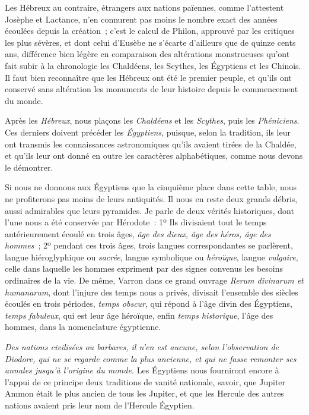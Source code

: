 \documentclass[french,twoside]{book} %
\begin{document}
Les Hébreux au contraire, étrangers aux nations  païennes, comme l’attestent Josèphe et Lactance, n’en connurent pas moins le nombre exact des années écoulées depuis la création ; c’est le calcul de Philon, approuvé par les critiques les plus sévères, et dont celui d’Eusèbe ne s’écarte d’ailleurs que de quinze cents ans, différence bien légère en comparaison des altérations monstrueuses qu’ont fait subir à la chronologie les Chaldéens, les Scythes, les Égyptiens et les Chinois. Il faut bien reconnaître que les Hébreux ont été le premier peuple, et qu’ils ont conservé sans altération les monuments de leur histoire depuis le commencement du monde.\par
Après les {\itshape Hébreux}, nous plaçons les {\itshape Chaldéens} et les {\itshape Scythes}, puis les {\itshape Phéniciens}. Ces derniers doivent précéder les {\itshape Égyptiens}, puisque, selon la tradition, ils leur ont transmis les connaissances astronomiques qu’ils avaient tirées de la Chaldée, et qu’ils leur ont donné en outre les caractères alphabétiques, comme nous devons le démontrer.\par
\par
Si nous ne donnons aux Égyptiens que la cinquième place dans cette table, nous ne profiterons pas moins de leurs antiquités. Il nous en reste deux grands débris, aussi admirables que leurs pyramides. Je parle de deux vérités historiques, dont l’une nous a été conservée par Hérodote : 1º Ils divisaient tout le temps antérieurement écoulé en trois âges, {\itshape âge des dieux, âge des héros, âge des hommes} ; 2º pendant ces trois âges, trois langues  correspondantes se parlèrent, langue hiéroglyphique ou {\itshape sacrée}, langue symbolique ou {\itshape héroïque}, langue {\itshape vulgaire}, celle dans laquelle les hommes expriment par des signes convenus les besoins ordinaires de la vie. De même, Varron dans ce grand ouvrage {\itshape Rerum divinarum et humanarum}, dont l’injure des temps nous a privés, divisait l’ensemble des siècles écoulés en trois périodes, {\itshape temps obscur}, qui répond à l’âge divin des Égyptiens, {\itshape temps fabuleux}, qui est leur âge héroïque, enfin {\itshape temps historique}, l’âge des hommes, dans la nomenclature égyptienne.\par
\emph{{\itshape Des nations civilisées ou barbares, il n’en est aucune}, selon l’observation de Diodore, {\itshape  qui ne se regarde comme la plus ancienne, et qui ne fasse remonter ses annales jusqu’à l’origine du monde.}} Les Égyptiens nous fourniront encore à l’appui de ce principe deux traditions de vanité nationale, savoir, que Jupiter Ammon était le plus ancien de tous les Jupiter, et que les Hercule des autres nations avaient pris leur nom de l’Hercule Égyptien.\par
\end{document}
